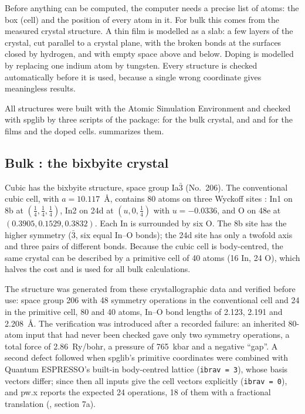 \begin{dftplain}
Before anything can be computed, the computer needs a precise list of atoms: the box (cell) and the position of every
atom in it. For bulk \InO{} this comes from the measured crystal structure. A thin film is modelled as a slab: a few
layers of the crystal, cut parallel to a crystal plane, with the broken bonds at the surfaces closed by hydrogen, and
with empty space above and below. Doping is modelled by replacing one indium atom by tungsten. Every structure is
checked automatically before it is used, because a single wrong coordinate gives meaningless results.
\end{dftplain}

{\sloppy
All structures were built with the Atomic Simulation Environment \citep{Larsen2017} and checked with spglib
\citep{Togo2018} by three scripts of the package:  for the bulk crystal, and
 and  for the films and the doped cells.
 summarizes them.\par}

\subsection{Bulk \texorpdfstring{\InO}{In2O3}: the bixbyite crystal}
\label{sec:dft-bulkstruct}

Cubic \InO{} has the bixbyite structure, space group Ia$\bar{3}$ (No.~206). The conventional cubic cell, with
$a = 10.117$~\AA, contains 80 atoms on three Wyckoff sites \citep{Marezio1966}: In1 on 8b at $(\frac14,\frac14,\frac14)$,
In2 on 24d at $(u, 0, \frac14)$ with $u = -0.0336$, and O on 48e at $(0.3905, 0.1529, 0.3832)$. Each In is surrounded by
six O. The 8b site has the higher symmetry ($\bar{3}$, six equal In--O bonds); the 24d site has only a twofold axis and
three pairs of different bonds. Because the cubic cell is body-centred, the same crystal can be described by a primitive
cell of 40 atoms (16 In, 24 O), which halves the cost and is used for all bulk calculations.

The structure was generated from these crystallographic data and verified before use: space group 206 with 48
symmetry operations in the conventional cell and 24 in the primitive cell, 80 and 40 atoms, In--O bond lengths of
2.123, 2.191 and 2.208~\AA. The verification was introduced after a recorded failure: an inherited 80-atom input that
had never been checked gave only two symmetry operations, a total force of 2.86~Ry/bohr, a pressure of 765~kbar and a
negative ``gap''. A second defect followed when spglib's primitive coordinates were combined with Quantum ESPRESSO's
built-in body-centred lattice (\texttt{ibrav = 3}), whose basis vectors differ; since then all inputs give the cell
vectors explicitly (\texttt{ibrav = 0}), and pw.x reports the expected 24 operations, 18 of them with a fractional
translation (, section 7a).

